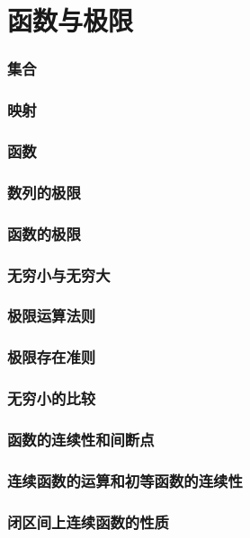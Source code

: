 \documentclass{article}
\begin{document}
  \tableofcontents
  \newpage

  \part{函数与极限}
  \section{集合}
    
  \section{映射}
    
  \section{函数}
    
  \section{数列的极限}
    
  \section{函数的极限}
    
  \section{无穷小与无穷大}
    
  \section{极限运算法则}
    
  \section{极限存在准则}
    
  \section{无穷小的比较}
    
  \section{函数的连续性和间断点}
    
  \section{连续函数的运算和初等函数的连续性}
    
  \section{闭区间上连续函数的性质}
    
\end{document}

